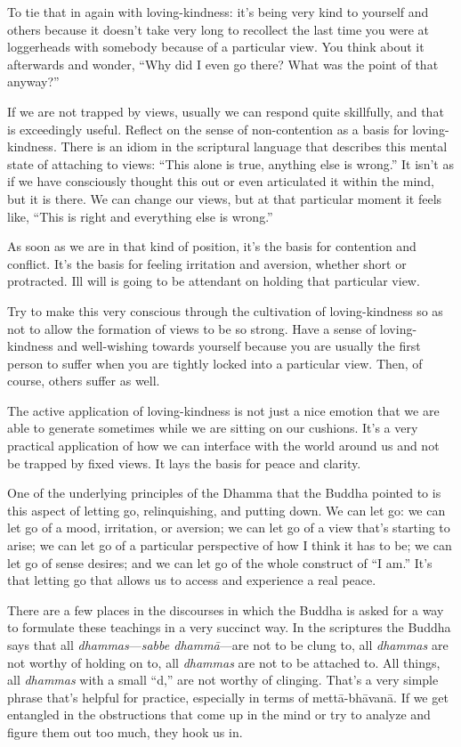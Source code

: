 To tie that in again with loving-kindness: it’s being very kind to
yourself and others because it doesn’t take very long to recollect the
last time you were at loggerheads with somebody because of a particular
view. You think about it afterwards and wonder, “Why did I even go
there? What was the point of that anyway?”

If we are not trapped by views, usually we can respond quite skillfully,
and that is exceedingly useful. Reflect on the sense of non-contention
as a basis for loving-kindness. There is an idiom in the scriptural
language that describes this mental state of attaching to views: “This
alone is true, anything else is wrong.” It isn’t as if we have
consciously thought this out or even articulated it within the mind, but
it is there. We can change our views, but at that particular moment it
feels like, “This is right and everything else is wrong.”

As soon as we are in that kind of position, it’s the basis for
contention and conflict. It’s the basis for feeling irritation and
aversion, whether short or protracted. Ill will is going to be attendant
on holding that particular view.

Try to make this very conscious through the cultivation of
loving-kindness so as not to allow the formation of views to be so
strong. Have a sense of loving-kindness and well-wishing towards
yourself because you are usually the first person to suffer when you are
tightly locked into a particular view. Then, of course, others suffer as
well.

The active application of loving-kindness is not just a nice emotion
that we are able to generate sometimes while we are sitting on our
cushions. It’s a very practical application of how we can interface with
the world around us and not be trapped by fixed views. It lays the basis
for peace and clarity.

One of the underlying principles of the Dhamma that the Buddha pointed
to is this aspect of letting go, relinquishing, and putting down. We can
let go: we can let go of a mood, irritation, or aversion; we can let go
of a view that’s starting to arise; we can let go of a particular
perspective of how I think it has to be; we can let go of sense desires;
and we can let go of the whole construct of “I am.” It’s that letting go
that allows us to access and experience a real peace.

There are a few places in the discourses in which the Buddha is asked
for a way to formulate these teachings in a very succinct way. In the
scriptures the Buddha says that all \emph{dhammas}—\emph{sabbe
dhammā}—are not to be clung to, all \emph{dhammas} are not worthy of
holding on to, all \emph{dhammas} are not to be attached to. All things,
all \emph{dhammas} with a small “d,” are not worthy of clinging. That’s
a very simple phrase that’s helpful for practice, especially in terms of
mettā-bhāvanā. If we get entangled in the obstructions that come up in
the mind or try to analyze and figure them out too much, they hook us
in.

